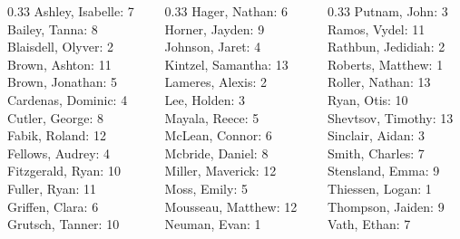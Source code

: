 \documentclass[10pt]{beamer}
\begin{document}
\begin{frame}
\begin{columns}
\begin{column}{0.33\textwidth}
Ashley, Isabelle: 7 \\ 
Bailey, Tanna: 8 \\ 
Blaisdell, Olyver: 2 \\ 
Brown, Ashton: 11 \\ 
Brown, Jonathan: 5 \\ 
Cardenas, Dominic: 4 \\ 
Cutler, George: 8 \\ 
Fabik, Roland: 12 \\ 
Fellows, Audrey: 4 \\ 
Fitzgerald, Ryan: 10 \\ 
Fuller, Ryan: 11 \\ 
Griffen, Clara: 6 \\ 
Grutsch, Tanner: 10 \\\end{column}
\begin{column}{0.33\textwidth}
Hager, Nathan: 6 \\ 
Horner, Jayden: 9 \\ 
Johnson, Jaret: 4 \\ 
Kintzel, Samantha: 13 \\ 
Lameres, Alexis: 2 \\ 
Lee, Holden: 3 \\ 
Mayala, Reece: 5 \\ 
McLean, Connor: 6 \\ 
Mcbride, Daniel: 8 \\ 
Miller, Maverick: 12 \\ 
Moss, Emily: 5 \\ 
Mousseau, Matthew: 12 \\ 
Neuman, Evan: 1 \\\end{column}
\begin{column}{0.33\textwidth}
Putnam, John: 3 \\ 
Ramos, Vydel: 11 \\ 
Rathbun, Jedidiah: 2 \\ 
Roberts, Matthew: 1 \\ 
Roller, Nathan: 13 \\ 
Ryan, Otis: 10 \\ 
Shevtsov, Timothy: 13 \\ 
Sinclair, Aidan: 3 \\ 
Smith, Charles: 7 \\ 
Stensland, Emma: 9 \\ 
Thiessen, Logan: 1 \\ 
Thompson, Jaiden: 9 \\ 
Vath, Ethan: 7 \\\end{column}
\end{columns}
\end{frame}
\end{document}
